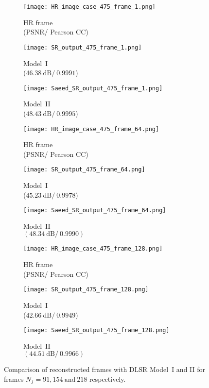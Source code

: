 \begin{figure} [!ht]
	\centering
	\begin{subfigure}[b]{.32\textwidth}
		\centering
		\texttt{[image: HR\_image\_case\_475\_frame\_1.png]}
		\caption{HR frame \\ (PSNR/ Pearson CC)}
		\label{fig:HR_1}
	\end{subfigure}
	\hfill
	\begin{subfigure}[b]{.32\textwidth}
		\centering
		\texttt{[image: SR\_output\_475\_frame\_1.png]}
		\caption{Model~I \\($46.38\ \text{dB}/\ 0.9991$)}
		\label{fig:num_f1_ijjeh}
	\end{subfigure}
	\hfill
	\begin{subfigure}[b]{.32\textwidth}
		\centering
		\texttt{[image: Saeed\_SR\_output\_475\_frame\_1.png]}
		\caption{Model~II \\ ($48.43\ \text{dB}/\ 0.9995$)}
		\label{fig:num_f1_saeed}	
	\end{subfigure}
	\hfill
	\begin{subfigure}[b]{.32\textwidth}
		\centering
		\texttt{[image: HR\_image\_case\_475\_frame\_64.png]}
		\caption{HR frame \\ (PSNR/ Pearson CC)}
		\label{fig:HR_2}
	\end{subfigure}
	\hfill
	\begin{subfigure}[b]{.32\textwidth}
		\centering
		\texttt{[image: SR\_output\_475\_frame\_64.png]}
		\caption{Model~I \\ ($45.23\ \text{dB}/\ 0.9978$)}
		\label{fig:num_f64_ijjeh}
	\end{subfigure}
	\hfill
	\begin{subfigure}[b]{.32\textwidth}
		\centering
		\texttt{[image: Saeed\_SR\_output\_475\_frame\_64.png]}
		\caption{Model~II \\ $(48.34\ \text{dB}/\ 0.9990)$}
		\label{fig:num_f64_saeed}	
	\end{subfigure}
	\hfill
	\begin{subfigure}[b]{.32\textwidth}
		\centering
		\texttt{[image: HR\_image\_case\_475\_frame\_128.png]}
		\caption{HR frame \\ (PSNR/ Pearson CC)}
		\label{fig:HR_3}
	\end{subfigure}
	\hfill
	\begin{subfigure}[b]{.32\textwidth}
		\centering
		\texttt{[image: SR\_output\_475\_frame\_128.png]}
		\caption{Model~I \\ ($42.66\ \text{dB}/\ 0.9949$)}
		\label{fig:num_f128_ijjeh}
	\end{subfigure}
	\hfill
	\begin{subfigure}[b]{.32\textwidth}
		\centering
		\texttt{[image: Saeed\_SR\_output\_475\_frame\_128.png]}
		\caption{Model~II \\ $(44.51\ \text{dB}/\ 0.9966)$}
		\label{fig:num_f128_saeed}	
	\end{subfigure}
	\caption{
		Comparison of reconstructed frames with DLSR Model~I and II for frames $N_f = 91, 154\ \text{and}\ 218 $ respectively. }
	\label{fig:num_results}
\end{figure}


